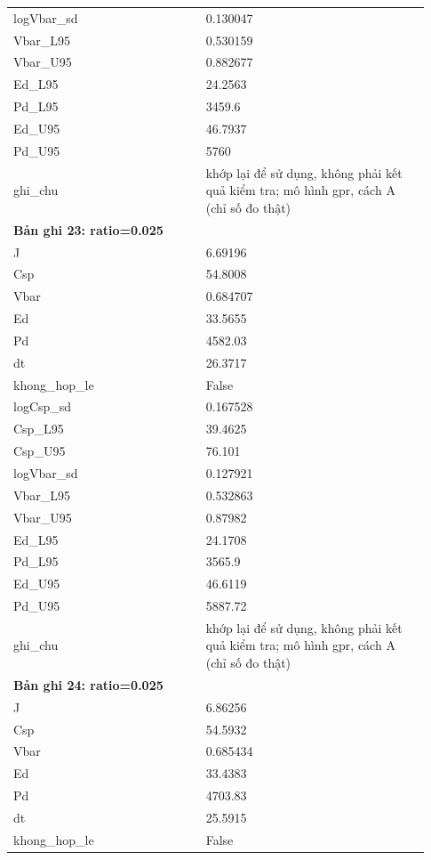 \begin{longtable}{p{0.43\linewidth}p{0.50\linewidth}}
logVbar\_\allowbreak sd & 0.130047 \\
Vbar\_\allowbreak L95 & 0.530159 \\
Vbar\_\allowbreak U95 & 0.882677 \\
Ed\_\allowbreak L95 & 24.2563 \\
Pd\_\allowbreak L95 & 3459.6 \\
Ed\_\allowbreak U95 & 46.7937 \\
Pd\_\allowbreak U95 & 5760 \\
ghi\_\allowbreak chu & khớp lại để sử dụng, không phải kết quả kiểm tra; mô hình gpr, cách A (chỉ số đo thật) \\
\midrule
\multicolumn{2}{p{0.95\linewidth}}{\textbf{Bản ghi 23: ratio=0.025}} \\
J & 6.69196 \\
Csp & 54.8008 \\
Vbar & 0.684707 \\
Ed & 33.5655 \\
Pd & 4582.03 \\
dt & 26.3717 \\
khong\_\allowbreak hop\_\allowbreak le & False \\
logCsp\_\allowbreak sd & 0.167528 \\
Csp\_\allowbreak L95 & 39.4625 \\
Csp\_\allowbreak U95 & 76.101 \\
logVbar\_\allowbreak sd & 0.127921 \\
Vbar\_\allowbreak L95 & 0.532863 \\
Vbar\_\allowbreak U95 & 0.87982 \\
Ed\_\allowbreak L95 & 24.1708 \\
Pd\_\allowbreak L95 & 3565.9 \\
Ed\_\allowbreak U95 & 46.6119 \\
Pd\_\allowbreak U95 & 5887.72 \\
ghi\_\allowbreak chu & khớp lại để sử dụng, không phải kết quả kiểm tra; mô hình gpr, cách A (chỉ số đo thật) \\
\midrule
\multicolumn{2}{p{0.95\linewidth}}{\textbf{Bản ghi 24: ratio=0.025}} \\
J & 6.86256 \\
Csp & 54.5932 \\
Vbar & 0.685434 \\
Ed & 33.4383 \\
Pd & 4703.83 \\
dt & 25.5915 \\
khong\_\allowbreak hop\_\allowbreak le & False \\

\end{longtable}

